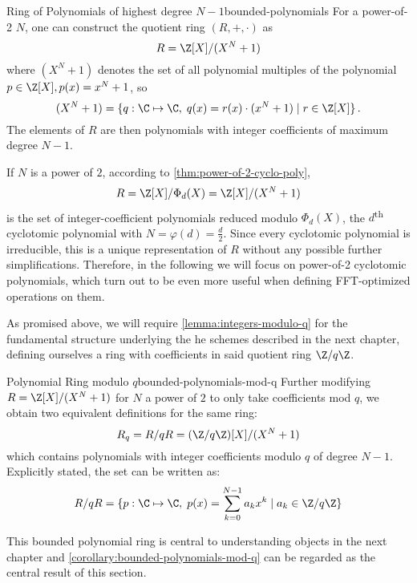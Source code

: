 \begin{definition}{Ring of Polynomials of highest degree $N-1$}{bounded-polynomials}
  For a power-of-2 $N$, one can construct the quotient ring $(R, +, \cdot)$ as
  $$R = \Z[X] / (X^N + 1)$$
  where $(X^N + 1)$ denotes the set of all polynomial multiples of the polynomial $p \in \Z[X], p(x) = x^N + 1$, so
  $$(X^N+1) = \{q: \C \mapsto \C,\; q(x) = r(x) \cdot (x^N+1) \;|\; r \in \Z[X]\} \,.$$
  The elements of $R$ are then polynomials with integer coefficients of maximum degree $N-1$.
\end{definition}

If $N$ is a power of $2$, according to \autoref{thm:power-of-2-cyclo-poly}, $$R = \Z[X] / \Phi_d(X) = \Z[X] / (X^N + 1)$$ is the set of integer-coefficient polynomials reduced modulo $\Phi_d(X)$, the $d$\textsuperscript{th} cyclotomic polynomial with $N = \varphi(d) = \frac{d}{2}$.
Since every cyclotomic polynomial is irreducible, this is a unique representation of $R$ without any possible further simplifications.
Therefore, in the following we will focus on power-of-2 cyclotomic polynomials, which turn out to be even more useful when defining FFT-optimized operations on them.

As promised above, we will require \autoref{lemma:integers-modulo-q} for the fundamental structure underlying the \gls{he} schemes described in the next chapter, defining ourselves a ring with coefficients in said quotient ring $\Z/q\Z$.

\begin{corollary}{Polynomial Ring modulo $q$}{bounded-polynomials-mod-q}
  Further modifying $R = \Z[X] / (X^N+1)$ for $N$ a power of $2$ to only take coefficients mod $q$, we obtain two equivalent definitions for the same ring:
  $$R_q = R/qR = (\Z/q\Z)[X] / (X^N+1)$$
  which contains polynomials with integer coefficients modulo $q$ of degree $N-1$.
  Explicitly stated, the set can be written as:
  $$R/qR = \{p: \C \mapsto \C,\; p(x) = \sum_{k=0}^{N-1} a_k x^k \;|\; a_k \in \Z/q\Z\}$$
\end{corollary}

This bounded polynomial ring is central to understanding objects in the next chapter and \autoref{corollary:bounded-polynomials-mod-q} can be regarded as the central result of this section.

\pagebreak
